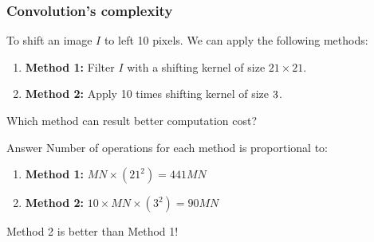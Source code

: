 \documentclass[english,11pt,table,handout]{beamer}
\begin{document}
\frame
{
	\frametitle{Convolution's complexity}
	\begin{example}
		To shift an image $I$ to left 10 pixels. We can apply the following methods:
		\begin{enumerate}
			\item \textbf{Method 1:} Filter $I$ with a shifting kernel of size $21 \times 21$.
			\item \textbf{Method 2:} Apply 10 times shifting kernel of size $3 \time 3$.
		\end{enumerate}
		Which method can result better computation cost?
		
	\end{example}
	\begin{block}{Answer}
	Number of operations for each method is proportional to:
	\begin{enumerate}
		\item \textbf{Method 1:} $MN \times (21^2) = 441MN$
		\item \textbf{Method 2:} $10 \times MN \times(3^2) = 90MN$
	\end{enumerate}
	Method 2 is better than Method 1!
	
	\end{block}

	
}
\end{document}
